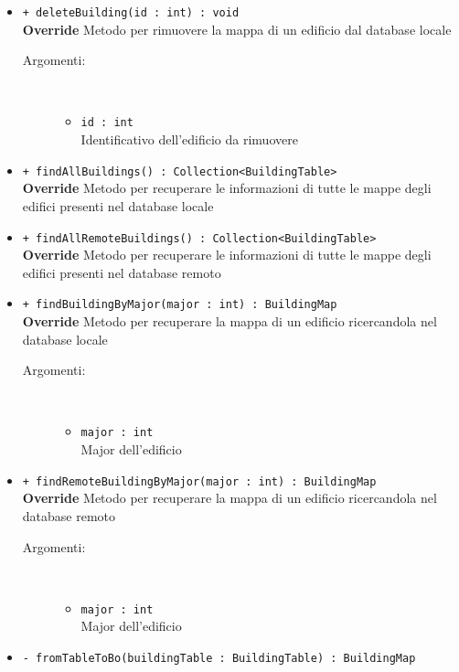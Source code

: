 \documentclass[../DefinizioneDiProdotto.tex]{subfiles}
\begin{document}
\begin{description}
\begin{itemize}
\begin{description}
\end{description}
\item \texttt{+ deleteBuilding(id : int) : void}\\
\textbf{Override} Metodo per rimuovere la mappa di un edificio dal database locale
 \begin{description}
\item[Argomenti:] \
\begin{itemize}
\item \texttt{id : int}\\
Identificativo dell'edificio da rimuovere\end{itemize}
\end{description}
\item \texttt{+ findAllBuildings() : Collection<BuildingTable>}\\
\textbf{Override} Metodo per recuperare le informazioni di tutte le mappe degli edifici presenti nel database locale
 \item \texttt{+ findAllRemoteBuildings() : Collection<BuildingTable>}\\
\textbf{Override} Metodo per recuperare le informazioni di tutte le mappe degli edifici presenti nel database remoto
 \item \texttt{+ findBuildingByMajor(major : int) : BuildingMap}\\
\textbf{Override} Metodo per recuperare la mappa di un edificio ricercandola nel database locale
 \begin{description}
\item[Argomenti:] \
\begin{itemize}
\item \texttt{major : int}\\
Major dell'edificio\end{itemize}
\end{description}
\item \texttt{+ findRemoteBuildingByMajor(major : int) : BuildingMap}\\
\textbf{Override} Metodo per recuperare la mappa di un edificio ricercandola nel database remoto
 \begin{description}
\item[Argomenti:] \
\begin{itemize}
\item \texttt{major : int}\\
Major dell'edificio\end{itemize}
\end{description}
\item \texttt{- fromTableToBo(buildingTable : BuildingTable) : BuildingMap}\\

\end{itemize}
\end{description}
\end{document}
